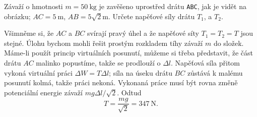 \begin{mdframed}[style=mdexam]
\begin{example}\label{fyz:fey_exam010}
  Závaží o hmotnosti \(m = \qty{50}{\kg}\) je zavěšeno uprostřed drátu \texttt{ABC}, jak je 
  vidět na obrázku; \(AC = \qty{5}{\m}\), \(AB = 5\sqrt{2}\unit{\m}\). Určete napěťové síly drátu 
  \(T_1\), a \(T_2\).
      
  {\centering
   \captionsetup{type=figure}
  \par}
  
  Všimněme si, že \(AC\) a \(BC\) svírají pravý úhel a že napěťové síty \(T_1 = T_2 = T\) jsou 
  stejné. Úlohu bychom mohli řešit prostým rozkladem tíhy závaží \(m\) do složek. Máme-li 
  použít princip virtuálních posunutí, můžeme si třeba představit, že část drátu \(AC\) malinko 
  popustíme, takže se prodlouží o \(\Delta l\). Napěťová síla přitom vykoná virtuální práci 
  \(\Delta W = T\Delta l\); síla na úseku drátu \(BC\) zůstává k malému posunutí kolmá, takže 
  práci nekoná. Vykonaná práce musí být rovna změně potenciální energie závaží \(mg\Delta 
  l/\sqrt{2}\). Odtud 
  \begin{equation*}
     T = \frac{mg}{\sqrt{2}}=\qty{347}{\newton}.
  \end{equation*}
\end{example}
\end{mdframed}